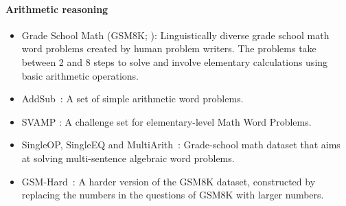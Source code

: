 \paragraph{Arithmetic reasoning}
\begin{itemize}

    \item Grade School Math (GSM8K; \citealp{cobbe2021gsm8k}): Linguistically diverse grade school math word problems created by human problem writers. The problems take between 2 and 8 steps to solve and involve elementary calculations using basic arithmetic operations.


    \item AddSub~\citep{hosseini2014addsub}: A set of simple arithmetic word problems.

    \item SVAMP \citep{patel2021svamp}: A challenge set for elementary-level Math Word Problems.
    

    \item SingleOP, SingleEQ and MultiArith~\citep{koncel2016mawps}: Grade-school math dataset that aims at solving multi-sentence algebraic word problems.

    \item GSM-Hard~\citep{gao2022pal}: A harder version of the GSM8K dataset, constructed by replacing the numbers in the questions of GSM8K with larger numbers.
    
\end{itemize}

